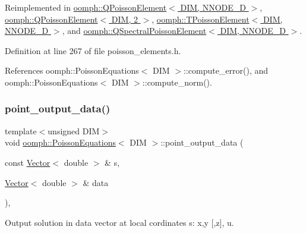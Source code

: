Reimplemented in \hyperlink{classoomph_1_1QPoissonElement_a11884e74fcb40b630380daa52aa6d2d7}{oomph\+::\+Q\+Poisson\+Element$<$ D\+I\+M, N\+N\+O\+D\+E\+\_\+D $>$}, \hyperlink{classoomph_1_1QPoissonElement_a11884e74fcb40b630380daa52aa6d2d7}{oomph\+::\+Q\+Poisson\+Element$<$ D\+I\+M, 2 $>$}, \hyperlink{classoomph_1_1TPoissonElement_a06d4e2f4c6bf67caf316af96e85b61d8}{oomph\+::\+T\+Poisson\+Element$<$ D\+I\+M, N\+N\+O\+D\+E\+\_\+D $>$}, and \hyperlink{classoomph_1_1QSpectralPoissonElement_aa18ae34af7cc2aee225d5e30a76edb10}{oomph\+::\+Q\+Spectral\+Poisson\+Element$<$ D\+I\+M, N\+N\+O\+D\+E\+\_\+D $>$}.



Definition at line 267 of file poisson\+\_\+elements.\+h.



References oomph\+::\+Poisson\+Equations$<$ D\+I\+M $>$\+::compute\+\_\+error(), and oomph\+::\+Poisson\+Equations$<$ D\+I\+M $>$\+::compute\+\_\+norm().

\mbox{\label{classoomph_1_1PoissonEquations_a03685536047faa97412f86030ffd91cb}} 
\subsubsection{\texorpdfstring{point\+\_\+output\+\_\+data()}{point\_output\_data()}}
{\footnotesize\ttfamily template$<$unsigned D\+IM$>$ \\
void \hyperlink{classoomph_1_1PoissonEquations}{oomph\+::\+Poisson\+Equations}$<$ D\+IM $>$\+::point\+\_\+output\+\_\+data (\begin{DoxyParamCaption}\item[{const \hyperlink{classoomph_1_1Vector}{Vector}$<$ double $>$ \&}]{s,  }\item[{\hyperlink{classoomph_1_1Vector}{Vector}$<$ double $>$ \&}]{data }\end{DoxyParamCaption})\hspace{0.3cm}{\ttfamily [inline]}, {\ttfamily [virtual]}}



Output solution in data vector at local cordinates s\+: x,y \mbox{[},z\mbox{]}, u. 



